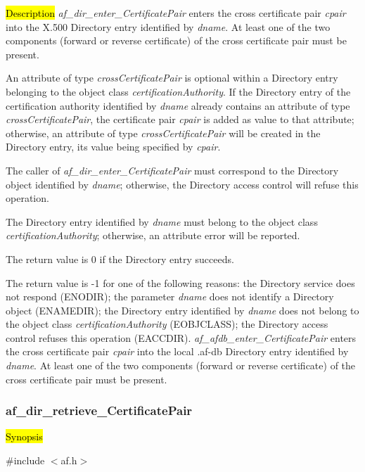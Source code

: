 \hl{Description}
{\em af\_dir\_enter\_CertificatePair} enters the cross certificate pair {\em cpair} 
into the X.500 Directory entry identified by {\em dname}. At least one of the two components 
(forward or reverse certificate) of the cross certificate pair must be present.

An attribute of type {\em crossCertificatePair} is optional within a Directory entry
belonging to the object class {\em certificationAuthority}. If the Directory entry of
the certification authority identified by {\em dname} already contains an attribute of
type {\em crossCertificatePair}, the certificate pair {\em cpair} is added as value
to that attribute; otherwise, an attribute of type {\em crossCertificatePair} will be
created in the Directory entry, its value being specified by {\em cpair}.

The caller of {\em af\_dir\_enter\_CertificatePair} must correspond to the Directory
object identified by {\em dname}; otherwise, the Directory access control will refuse 
this operation.

The Directory entry identified by {\em dname} must belong to the object class
{\em certificationAuthority}; otherwise, an attribute error will be reported.

The return value is 0 if the Directory entry succeeds.

The return value is -1 for one of the following reasons:
\bi
\m the Directory service does not respond (ENODIR);
\m the parameter {\em dname} does not identify a Directory object (ENAMEDIR);
\m the Directory entry identified by {\em dname} does not belong to the object class
{\em certificationAuthority} (EOBJCLASS);
\m the Directory access control refuses this operation (EACCDIR).
\ei
{\em af\_afdb\_enter\_CertificatePair} enters the cross certificate pair {\em cpair} 
into the local .af-db Directory entry identified by {\em dname}. At least one of the two components 
(forward or reverse certificate) of the cross certificate pair must be present.



\subsubsection{af\_dir\_retrieve\_CertificatePair}

\hl{Synopsis}

\#include $<$af.h$>$


